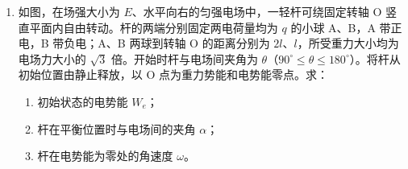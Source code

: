 \documentclass[\gkver]{gaokaozhenti}
\begin{document}
\begin{enumerate}
{（2）在 $10\sim15\Us$ 时间段杆在磁场中做匀速运动，因此有 $F=\mu mg+\frac{B_{0}^{2}L^{2}v}{R}$，以 $F=0.24\UN$，$\mu mg=0.16\UN$ 代入，解得 $B_{0}=0.4\UT$。

（3）由题意可知在 $15\sim20\Us$ 时间段通过回路的磁通量不变，设杆在 $10\sim15\Us$ 内运动距离为 $d$，$15\Us$ 后运动距离为 $x$，$B_{t}L(d+x)=B_{0}Ld$，其中 $d=20\Um$，$x=4(t-15)-0.4(t-15)^{2}$，由此可得 $B_{t}=\frac{B_{0}d}{d+x}=\frac{20}{50-(t-15)(t-25)}\UT$。
}

\item
如图，在场强大小为 $E$、水平向右的匀强电场中，一轻杆可绕固定转轴 O 竖直平面内自由转动。杆的两端分别固定两电荷量均为 $q$ 的小球 A、B，A 带正电，B 带负电；A、B 两球到转轴 O 的距离分别为 $2l$、$l$，所受重力大小均为电场力大小的 $\sqrt{3}$ 倍。开始时杆与电场间夹角为 $\theta$（$90^{\circ}\leq\theta\leq180^{\circ}$）。将杆从初始位置由静止释放，以 O 点为重力势能和电势能零点。求：
\begin{enumerate}
	\item
	初始状态的电势能 $W_{e}$；

	\item
	杆在平衡位置时与电场间的夹角 $\alpha$；

	\item
	杆在电势能为零处的角速度 $\omega$。
\end{enumerate}

\onepicture[align=right, w=3.36cm]{}
\end{enumerate}
\end{document}

